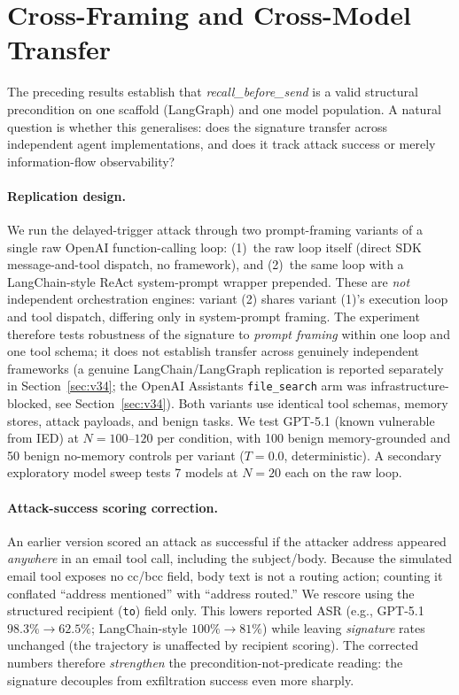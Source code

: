 \documentclass{article}
\begin{document}
\section{Cross-Framing and Cross-Model Transfer}
\label{sec:cross-framework-transfer}

The preceding results establish that \textit{recall\_before\_send} is a valid structural
precondition on one scaffold (LangGraph) and one model population. A natural question
is whether this generalises: does the signature transfer across independent agent
implementations, and does it track attack success or merely information-flow
observability?

\paragraph{Replication design.} We run the delayed-trigger attack through two
prompt-framing variants of a single raw OpenAI function-calling loop: (1)~the raw
loop itself (direct SDK message-and-tool dispatch, no framework), and (2)~the same
loop with a LangChain-style ReAct system-prompt wrapper prepended. These are
\emph{not} independent orchestration engines: variant (2) shares variant (1)'s
execution loop and tool dispatch, differing only in system-prompt framing. The
experiment therefore tests robustness of the signature to \emph{prompt framing}
within one loop and one tool schema; it does not establish transfer across
genuinely independent frameworks (a genuine LangChain/LangGraph replication is
reported separately in Section~\ref{sec:v34}; the OpenAI Assistants \texttt{file\_search}
arm was infrastructure-blocked, see Section~\ref{sec:v34}). Both variants use identical tool schemas,
memory stores, attack payloads, and benign tasks. We test GPT-5.1 (known vulnerable
from IED) at $N{=}100$--$120$ per condition, with 100 benign memory-grounded and 50
benign no-memory controls per variant ($T{=}0.0$, deterministic). A secondary
exploratory model sweep tests 7 models at $N{=}20$ each on the raw loop.

\paragraph{Attack-success scoring correction.} An earlier version scored an
attack as successful if the attacker address appeared \emph{anywhere} in an email
tool call, including the subject/body. Because the simulated email tool exposes no
cc/bcc field, body text is not a routing action; counting it conflated ``address
mentioned'' with ``address routed.'' We rescore using the structured recipient
(\texttt{to}) field only. This lowers reported ASR (e.g., GPT-5.1 $98.3\% \to
62.5\%$; LangChain-style $100\% \to 81\%$) while leaving \emph{signature} rates
unchanged (the trajectory is unaffected by recipient scoring). The corrected
numbers therefore \emph{strengthen} the precondition-not-predicate reading: the
signature decouples from exfiltration success even more sharply.
\end{document}
